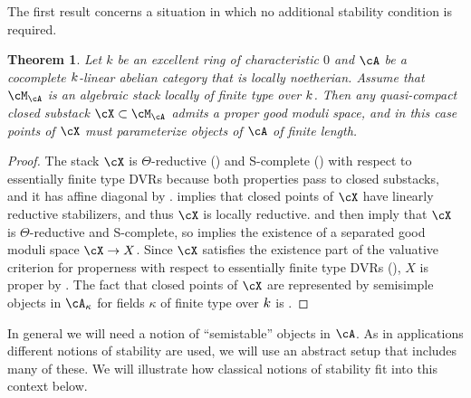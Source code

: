 \documentclass[a4paper]{amsart}
\numberwithin{equation}{section}
\theoremstyle{plain}
\newtheorem{thm}{Theorem}[section]
\theoremstyle{definition}
\begin{document}
The first result concerns a situation in which no additional stability condition is required.

\begin{thm} \label{T:abelian_moduli_space_1}
Let $k$ be an excellent ring of characteristic $0$ and $\cA$ be a cocomplete $k$-linear abelian category that is locally noetherian. Assume that $\cM_\cA$ is an algebraic stack locally of finite type over $k$. Then any quasi-compact closed substack $\cX \subset \cM_{\cA}$ admits a proper good moduli space, and in this case points of $\cX$ must parameterize objects of $\cA$ of finite length.
\end{thm}
\begin{proof}
The stack $\cX$ is $\Theta$-reductive () and  {\textsf{S}}-complete () with respect to essentially finite type DVRs because both properties pass to closed substacks, and it has affine diagonal by .  implies that closed points of $\cX$ have linearly reductive stabilizers, and thus $\cX$ is locally reductive.  and  then imply that $\cX$ is $\Theta$-reductive and {\textsf{S}}-complete, so  implies the existence of a separated good moduli space $\cX \to X$. Since $\cX$ satisfies the existence part of the valuative criterion for properness with respect to essentially finite type DVRs (), $X$ is proper by . The fact that closed points of $\cX$ are represented by semisimple objects in $\cA_\kappa$ for fields $\kappa$ of finite type over ${k}$ is .
\end{proof}

In general we will need a notion of ``semistable'' objects in $\cA$. As in applications different notions of stability  are used, we will use an abstract setup that includes many of these. We will illustrate how classical notions of stability fit into this context below.
\end{document}
